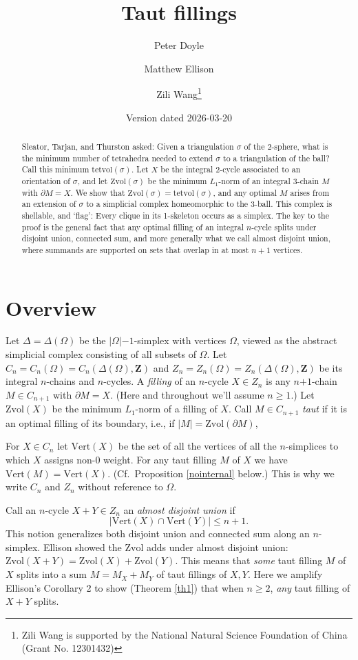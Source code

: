 \documentclass[12pt]{article}
\title{Taut fillings}
\author{Peter Doyle \and Matthew Ellison \and Zili Wang\thanks{
Zili Wang is supported by
the National Natural Science Foundation of China (Grant No. 12301432)
}}
\date{Version dated 2026-03-20
}
\def\ZZ{\mathbf{Z}}
\def\del{\partial}
\newcommand{\kw}{\mathrm}
\newcommand{\vertices}{\kw{Vert}}
\newcommand{\Zvol}{\kw{Zvol}}
\newcommand{\pls}{\mathord{+}}
\newcommand{\mns}{\mathord{-}}
\begin{document}
\maketitle

\begin{abstract}
Sleator, Tarjan, and Thurston asked:
Given a triangulation $\sigma$ of the 2-sphere,
what is the minimum number of tetrahedra needed to 
extend $\sigma$ to a triangulation of the ball?
Call this minimum $\mathrm{tetvol}(\sigma)$.
Let $X$ be the integral 2-cycle associated to an orientation of $\sigma$,
and let $\mathrm{Zvol}(\sigma)$ be the minimum $L_1$-norm
of an integral 3-chain $M$
with $\del M = X$.
We show that $\mathrm{Zvol}(\sigma) = \mathrm{tetvol}(\sigma)$,
and any optimal $M$ 
arises from an extension of $\sigma$ to
a simplicial complex homeomorphic to the 3-ball.
This complex is shellable, and `flag':
Every clique in its 1-skeleton occurs as a simplex.
The key to the proof is the general
fact that any optimal filling of an integral $n$-cycle
splits under disjoint union, connected sum, and more generally
what we call almost disjoint union,
where summands are supported on sets that overlap in at most $n+1$ vertices.
\end{abstract}

\section{Overview}
Let $\Delta = \Delta(\Omega)$ be the $|\Omega|\mns 1$-simplex
with vertices $\Omega$,
viewed as the abstract simplicial complex consisting of all subsets of
$\Omega$.
Let $C_n=C_n(\Omega)=C_n(\Delta(\Omega),\ZZ)$
and $Z_n=Z_n(\Omega)=Z_n(\Delta(\Omega),\ZZ)$
be its integral $n$-chains and $n$-cycles.
A \emph{filling} of an $n$-cycle $X \in Z_n$ is any
$n\pls 1$-chain $M \in C_{n+1}$ with $\del M = X$.
(Here and throughout we'll assume $n\geq 1$.)
Let $\Zvol(X)$ be the minimum $L_1$-norm of a filling of $X$.
Call $M \in C_{n+1}$ \emph{taut} if it is an optimal filling
of its boundary, i.e., if $|M|=\Zvol(\del M)$,

For $X \in C_n$ let
$\vertices(X)$ be the set of all the vertices of all the $n$-simplices
to which $X$ assigns non-$0$ weight.
For any taut filling $M$ of $X$ we have $\vertices(M) = \vertices(X)$.
(Cf.\ Proposition \ref{nointernal} below.)
This is why we write $C_n$ and $Z_n$ without reference to $\Omega$.

Call an $n$-cycle $X+Y \in Z_n$ an \emph{almost disjoint union} if
\[
|\vertices(X) \cap \vertices(Y)| \leq n+1
.
\]
This notion generalizes both disjoint union and connected sum
along an $n$-simplex.
Ellison \cite{ellison:gap}
showed the $\Zvol$ adds under almost disjoint union:
$\Zvol(X+Y) = \Zvol(X) + \Zvol(Y)$.
This means that \emph{some} taut filling $M$ of $X$ splits into a sum
$M=M_X+M_Y$ of taut fillings of $X,Y$.
Here we amplify Ellison's Corollary 2 to show (Theorem \ref{th1})
that when $n \geq 2$, \emph{any} taut filling of $X+Y$ splits.
\end{document}
